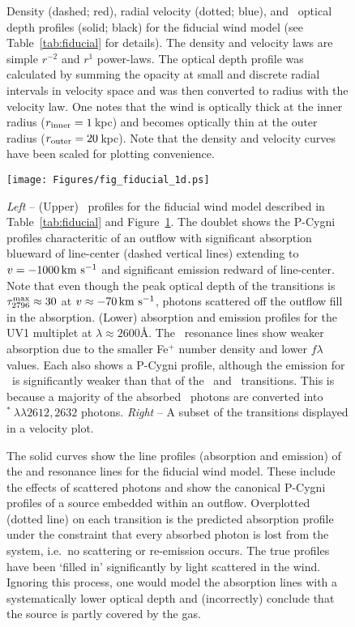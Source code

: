 \documentclass[12pt,preprint]{aastex}
\begin{document}
\begin{figure}
\caption{
Density (dashed; red), radial velocity (dotted; blue), and
\mgiia\ optical depth profiles (solid; black) for the fiducial
wind model (see Table~\ref{tab:fiducial} for details).
The density and velocity laws are simple $r^{-2}$ and $r^1$
power-laws.  The optical depth profile was calculated by summing
the opacity at small and discrete radial intervals in velocity space
and was then converted to radius with the velocity law.  One notes that
the wind is optically thick at the inner radius ($r_{\rm inner} =
1$\,kpc) and becomes optically thin at the outer radius ($r_{\rm
  outer} = 20$\,kpc).
Note that the density and velocity curves have been scaled for plotting
convenience.  
}
\label{fig:fiducial_nvt}
\end{figure}

\begin{figure}
\texttt{[image: Figures/fig\_fiducial\_1d.ps]}
\caption{
{\it Left} -- (Upper) \mgiid\ profiles for the fiducial wind model
described in Table~\ref{tab:fiducial} and
Figure~\ref{fig:fiducial_nvt}.  The doublet shows the P-Cygni profiles
characteritic of an outflow with significant absorption blueward of
line-center (dashed vertical lines) extending to $v = -1000\, {\rm km~s^{-1}}$
and significant emission redward of line-center.  Note
that even though the peak optical depth of the  transitions
is $\tau_{2796}^{\rm max} \approx 30$ at $v \approx -70 \, {\rm km~s^{-1}}$,
photons scattered off the outflow fill in the absorption.
(Lower)  absorption and emission profiles for the UV1
multiplet at $\lambda \approx 2600$\AA.  The \feiid\ resonance lines 
show weaker absorption due to the smaller Fe$^+$ number density and
lower $f\lambda$ values.  Each also shows a P-Cygni profile, although
the emission for \feiia\ is significantly weaker than that of the
\feiib\ and \mgiid\ transitions.  This is because a majority of the
absorbed \feiia\ photons are converted into
$^*~\lambda\lambda 2612, 2632$ photons.
{\it Right} -- A subset of the transitions displayed in a velocity
plot.
}
\label{fig:fiducial_1d}
\end{figure}

\begin{figure}
\caption{
The solid curves show the line profiles (absorption and emission) of
the  and  resonance lines for the fiducial wind
model.  These include the effects of scattered photons and show the
canonical P-Cygni profiles of a source 
embedded within an outflow.  Overplotted (dotted line) on each transition is
the predicted absorption profile under the constraint that every
absorbed photon is lost from the system, i.e.\ no scattering or
re-emission occurs.   The true profiles have been `filled
in' significantly by light scattered in the wind.  Ignoring this
process, one would model the absorption lines with a systematically lower
optical depth and (incorrectly) conclude that the source is partly covered by the
gas.  
}
\label{fig:noemiss}
\end{figure}
\end{document}
